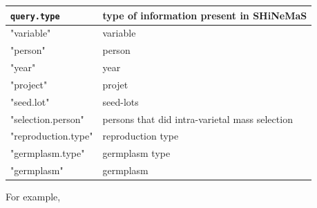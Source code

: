 \documentclass{article}\usepackage[]{graphicx}\usepackage[]{color}
\newcommand{\BD}{SHiNeMaS}
\begin{document}
\begin{center}
\begin{tabular}{ll}
\hline
\texttt{query.type} & type of information present in \BD \\
\hline
"variable" & variable \\
"person" & person \\
"year" & year \\
"project" & projet \\
"seed.lot" & seed-lots \\
"selection.person" & persons that did intra-varietal mass selection \\
"reproduction.type" & reproduction type \\
"germplasm.type" & germplasm type \\
"germplasm" & germplasm \\
\hline
\end{tabular}
\end{center}

For example,
\end{document}
